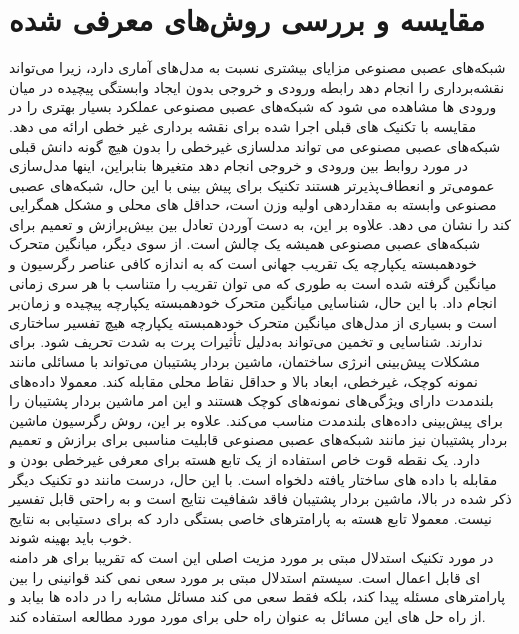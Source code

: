 \section{مقایسه و بررسی روش‌های معرفی شده}
شبکه‌های عصبی مصنوعی مزایای بیشتری نسبت به مدل‌های آماری دارد، زیرا می‌تواند نقشه‌برداری را انجام دهد
رابطه ورودی و خروجی بدون ایجاد وابستگی پیچیده
در میان ورودی ها مشاهده می شود که شبکه‌های عصبی مصنوعی عملکرد بسیار بهتری را در مقایسه با تکنیک های قبلی
 اجرا شده برای نقشه برداری غیر خطی ارائه می دهد. شبکه‌های عصبی مصنوعی می تواند مدلسازی غیرخطی را بدون هیچ گونه دانش قبلی در مورد روابط بین ورودی و خروجی انجام دهد
متغیرها بنابراین، اینها مدل‌سازی عمومی‌تر و انعطاف‌پذیرتر هستند
تکنیک برای پیش بینی با این حال، شبکه‌های عصبی مصنوعی وابسته به مقداردهی اولیه وزن است، حداقل های محلی و مشکل همگرایی کند را نشان می دهد. علاوه بر این،
 به دست آوردن تعادل
  بین بیش‌برازش و تعمیم برای
   شبکه‌های عصبی مصنوعی همیشه یک چالش است. از سوی دیگر، میانگین متحرک خودهمبسته یکپارچه یک تقریب جهانی است که به اندازه کافی عناصر رگرسیون و میانگین گرفته شده است  به طوری که می توان تقریب
  را متناسب با هر سری زمانی
  انجام داد. با این حال، شناسایی میانگین متحرک خودهمبسته یکپارچه پیچیده و زمان‌بر است و بسیاری از مدل‌های میانگین متحرک خودهمبسته یکپارچه هیچ تفسیر ساختاری ندارند. شناسایی و تخمین می‌تواند
   به‌دلیل تأثیرات پرت به شدت تحریف شود.
   برای مشکلات پیش‌بینی انرژی ساختمان، ماشین بردار پشتیبان می‌تواند با مسائلی مانند نمونه کوچک، غیرخطی، ابعاد بالا و حداقل نقاط محلی مقابله کند. 
   معمولا داده‌های بلندمدت دارای ویژگی‌های نمونه‌های کوچک هستند و این امر ماشین بردار پشتیبان را برای پیش‌بینی داده‌های بلندمدت مناسب می‌کند.
    علاوه بر این، روش رگرسیون ماشین بردار پشتیبان نیز مانند شبکه‌های عصبی مصنوعی قابلیت مناسبی برای برازش و تعمیم دارد. یک نقطه قوت خاص استفاده از یک تابع هسته برای معرفی غیرخطی بودن
     و مقابله با داده های ساختار یافته دلخواه است. 
    با این حال، درست مانند دو تکنیک دیگر ذکر شده در بالا، ماشین بردار پشتیبان فاقد شفافیت نتایج است و به راحتی قابل تفسیر نیست. معمولا تابع هسته به پارامترهای خاصی بستگی دارد
 که برای دستیابی به نتایج خوب باید بهینه شوند.
 \\
 در مورد تکنیک استدلال مبتی بر مورد مزیت اصلی این است که تقریبا برای هر دامنه ای قابل اعمال است. سیستم استدلال مبتی بر مورد سعی نمی کند قوانینی را بین پارامترهای مسئله پیدا کند،
  بلکه فقط سعی می کند مسائل مشابه را در داده ها بیابد 
 و از راه حل های این مسائل
  به عنوان راه حلی برای مورد مورد مطالعه استفاده کند. 
